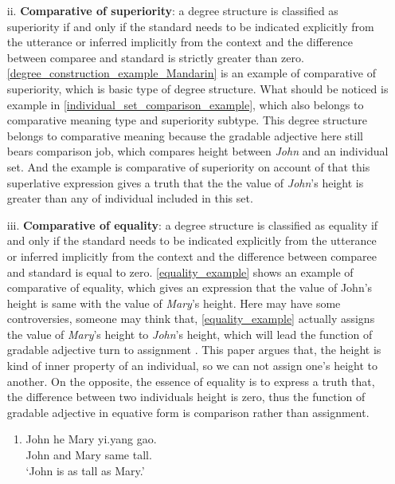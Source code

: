 \documentclass{ctexart}
\let \cite \parencite
\begin{document}
\begin{itemize}
\begin{itemize}
        \item[ii.] \textbf{Comparative of superiority}: a degree structure is classified as superiority if and only if the standard needs to be indicated explicitly from the utterance or inferred implicitly from the context and the difference between comparee and standard is strictly greater than zero. \ref{degree_construction_example_Mandarin} is an example of comparative of superiority, which is basic type of degree structure. What should be noticed is example in \ref{individual_set_comparison_example}, which also belongs to comparative meaning type and superiority subtype. This degree structure belongs to comparative meaning because the gradable adjective here still bears comparison job, which compares height between \textit{John} and an individual set. And the example is comparative of superiority on account of that this superlative expression gives a truth that the the value of \textit{John}'s height is greater than any of individual included in this set.
        
        \item[iii.] \textbf{Comparative of equality}: a degree structure is classified as equality if and only if the standard needs to be indicated explicitly from the utterance or inferred implicitly from the context and the difference between comparee and standard is equal to zero. \ref{equality_example} shows an example of comparative of equality, which gives an expression that the value of John's height is same with the value of \textit{Mary}'s height. Here may have some controversies, someone may think that, \ref{equality_example} actually assigns the value of \textit{Mary}'s height to \textit{John}'s height, which will lead the function of gradable adjective turn to assignment \cite{guo2012}. This paper argues that, the height is kind of inner property of an individual, so we can not assign one's height to another. On the opposite, the essence of equality is to express a truth that, the difference between two individuals height is zero, thus the function of gradable adjective in equative form is comparison rather than assignment.
        
        \begin{enumerate}
            \item \label{equality_example}
            John he \enspace Mary \enspace yi.yang \enspace gao.\\
            John and Mary \enspace \enspace same \enspace \enspace tall.\\
            `John is as tall as Mary.'
        \end{enumerate}

    \end{itemize}   

\end{itemize}
\end{document}
